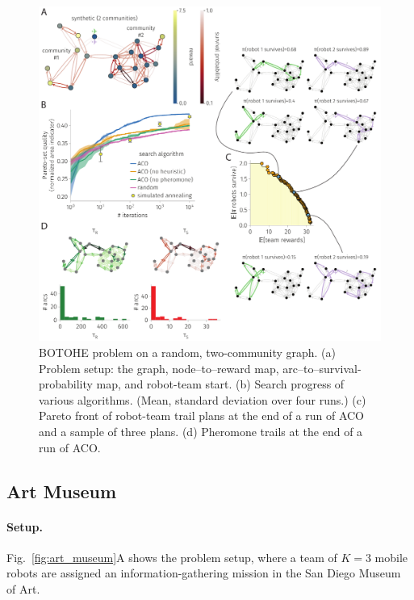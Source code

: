\documentclass[fleqn,10pt,lineno]{wlpeerj}
\begin{document}
\begin{figure}[h!]
    \centering
    	\includegraphics[width=\textwidth]{block_model_results.pdf}
    \caption{
    BOTOHE problem on a random, two-community graph. 
    (a) Problem setup: the graph, node--to--reward map, arc--to--survival-probability map, and robot-team start.
    (b) Search progress of various algorithms. (Mean, standard deviation over four runs.)
    (c) Pareto front of robot-team trail plans at the end of a run of ACO and a sample of three plans.
    (d) Pheromone trails at the end of a run of ACO.
    } \label{fig:two_community}
\end{figure}

\subsection{Art Museum}

\paragraph{Setup.}
Fig.~\ref{fig:art_museum}A shows the problem setup, where a team of $K=3$ mobile robots are assigned an information-gathering mission in the San Diego Museum of Art. 
\end{document}
